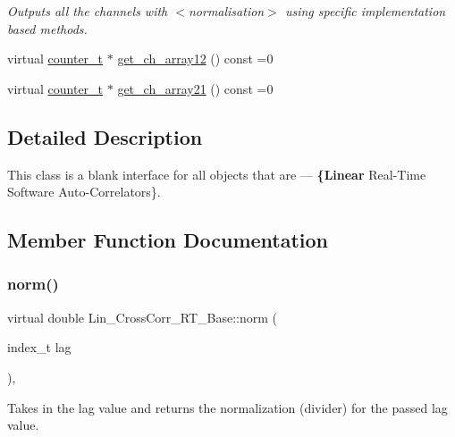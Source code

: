 \begin{DoxyCompactItemize}
\begin{DoxyCompactList}\small\item\em Outputs all the channels with {\bfseries } $<$normalisation$>$ using specific implementation based methods. \end{DoxyCompactList}\item 
virtual \hyperlink{types_8hpp_a22f279793847eba127de149437848c48}{counter\+\_\+t} $\ast$ \hyperlink{group__Lin__CorrCorr__Base__Out_gacc777900e8d232740373a70c1d5b4cce}{get\+\_\+ch\+\_\+array12} () const =0
\item 
virtual \hyperlink{types_8hpp_a22f279793847eba127de149437848c48}{counter\+\_\+t} $\ast$ \hyperlink{group__Lin__CorrCorr__Base__Out_ga9f075c765376a156da279b23bc18c07f}{get\+\_\+ch\+\_\+array21} () const =0
\end{DoxyCompactItemize}


\subsection{Detailed Description}
This class is a blank interface for all objects that are — {\bfseries \{Linear} Real-\/\+Time Software Auto-\/\+Correlators\}. 

\subsection{Member Function Documentation}
\mbox{\label{classLin__CrossCorr__RT__Base_a43779bc7fd546fa8f73713de4bd6e285}} 
\subsubsection{\texorpdfstring{norm()}{norm()}}
{\footnotesize\ttfamily virtual double Lin\+\_\+\+Cross\+Corr\+\_\+\+R\+T\+\_\+\+Base\+::norm (\begin{DoxyParamCaption}\item[{index\+\_\+t}]{lag }\end{DoxyParamCaption})\hspace{0.3cm}{\ttfamily [inline]}, {}}



Takes in the lag value and returns the normalization (divider) for the passed lag value. 

